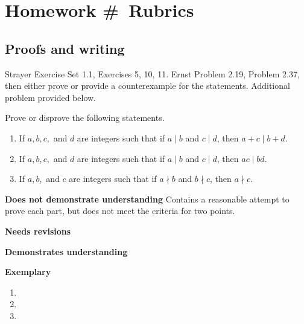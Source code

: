 \documentclass[letterpaper, 11pt]{../ximera}
\begin{document}
\chapter{Homework \#\homework\ Rubrics}

\section*{Proofs and writing}  %
Strayer Exercise Set 1.1, Exercises 5, 10, 11. Ernst Problem 2.19, Problem 2.37, then either prove or provide a counterexample for the statements. Additional problem provided below.

\begin{ex}
 Prove or disprove the following statements.
	\begin{enumerate}[label=(\alph*)] %
		\item If $a,b,c,$ and $d$ are integers such that if $a\mid b$ and $c\mid d$, then $a+c\mid b+d$.
		\item If $a,b,c,$ and $d$ are integers such that if $a\mid b$ and $c\mid d$, then $ac\mid bd$.
		\item If $a,b,$ and $c$ are integers such that if $a\nmid b$ and $b\nmid c$, then $a\nmid c$.
	\end{enumerate}
\end{ex}

\begin{writeRubric}
    \item \textbf{Does not demonstrate understanding}
     Contains a reasonable attempt to prove each part, but does not meet the criteria for two points.
    \item \textbf{Needs revisions}
     
    \item \textbf{Demonstrates understanding}
    
    \item \textbf{Exemplary}
        
\end{writeRubric}
                                       
\begin{solution}
 	\begin{enumerate}[label=(\alph*)] %
		\item %
		\item %
		\item %
	\end{enumerate}
\end{solution}
\end{document}
